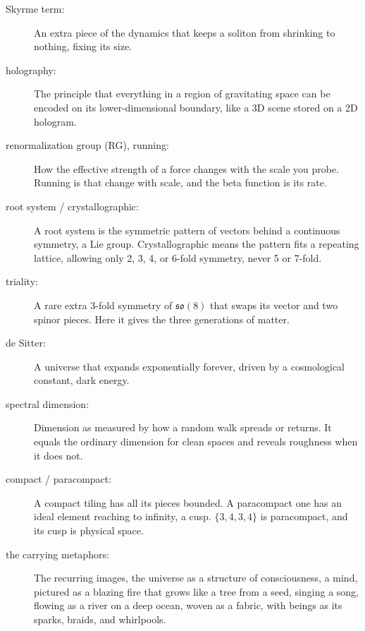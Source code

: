 \begin{description}
  \item[Skyrme term:] An extra piece of the dynamics that keeps a soliton from shrinking to nothing, fixing its
  size.
  \item[holography:] The principle that everything in a region of gravitating space can be encoded on its
  lower-dimensional boundary, like a 3D scene stored on a 2D hologram.
  \item[renormalization group (RG), running:] How the effective strength of a force changes with the scale you
  probe. Running is that change with scale, and the beta function is its rate.
  \item[root system / crystallographic:] A root system is the symmetric pattern of vectors behind a continuous
  symmetry, a Lie group. Crystallographic means the pattern fits a repeating lattice, allowing only 2, 3, 4, or
  6-fold symmetry, never 5 or 7-fold.
  \item[triality:] A rare extra 3-fold symmetry of $\mathfrak{so}(8)$ that swaps its vector and two spinor pieces.
  Here it gives the three generations of matter.
  \item[de Sitter:] A universe that expands exponentially forever, driven by a cosmological constant, dark energy.
  \item[spectral dimension:] Dimension as measured by how a random walk spreads or returns. It equals the ordinary
  dimension for clean spaces and reveals roughness when it does not.
  \item[compact / paracompact:] A compact tiling has all its pieces bounded. A paracompact one has an ideal element
  reaching to infinity, a cusp. $\{3,4,3,4\}$ is paracompact, and its cusp is physical space.
  \item[the carrying metaphors:] The recurring images, the universe as a structure of consciousness, a mind,
  pictured as a blazing fire that grows like a tree from a seed, singing a song, flowing as a river on a deep
  ocean, woven as a fabric, with beings as its sparks, braids, and whirlpools.
\end{description}
